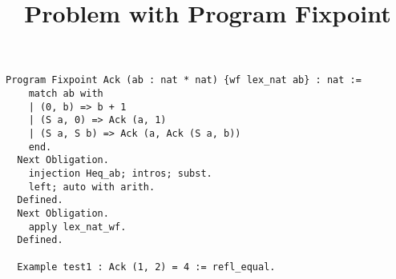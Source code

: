 \documentclass[a4paper]{book}
\title{Problem with Program Fixpoint}
\begin{document}


\begin{verbatim}
Program Fixpoint Ack (ab : nat * nat) {wf lex_nat ab} : nat :=
    match ab with
    | (0, b) => b + 1
    | (S a, 0) => Ack (a, 1)
    | (S a, S b) => Ack (a, Ack (S a, b))
    end.
  Next Obligation.
    injection Heq_ab; intros; subst.
    left; auto with arith.
  Defined.
  Next Obligation.
    apply lex_nat_wf.
  Defined.
  
  Example test1 : Ack (1, 2) = 4 := refl_equal.  
\end{verbatim}


\end{document}
